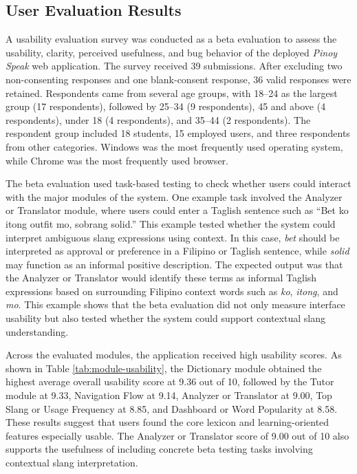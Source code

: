 \subsection{User Evaluation Results}
A usability evaluation survey was conducted as a beta evaluation to assess the usability, clarity, perceived usefulness, and bug behavior of the deployed \textit{Pinoy Speak} web application. The survey received 39 submissions. After excluding two non-consenting responses and one blank-consent response, 36 valid responses were retained. Respondents came from several age groups, with 18--24 as the largest group (17 respondents), followed by 25--34 (9 respondents), 45 and above (4 respondents), under 18 (4 respondents), and 35--44 (2 respondents). The respondent group included 18 students, 15 employed users, and three respondents from other categories. Windows was the most frequently used operating system, while Chrome was the most frequently used browser.

The beta evaluation used task-based testing to check whether users could interact with the major modules of the system. One example task involved the Analyzer or Translator module, where users could enter a Taglish sentence such as ``Bet ko itong outfit mo, sobrang solid.'' This example tested whether the system could interpret ambiguous slang expressions using context. In this case, \textit{bet} should be interpreted as approval or preference in a Filipino or Taglish sentence, while \textit{solid} may function as an informal positive description. The expected output was that the Analyzer or Translator would identify these terms as informal Taglish expressions based on surrounding Filipino context words such as \textit{ko}, \textit{itong}, and \textit{mo}. This example shows that the beta evaluation did not only measure interface usability but also tested whether the system could support contextual slang understanding.

Across the evaluated modules, the application received high usability scores. As shown in Table \ref{tab:module-usability}, the Dictionary module obtained the highest average overall usability score at 9.36 out of 10, followed by the Tutor module at 9.33, Navigation Flow at 9.14, Analyzer or Translator at 9.00, Top Slang or Usage Frequency at 8.85, and Dashboard or Word Popularity at 8.58. These results suggest that users found the core lexicon and learning-oriented features especially usable. The Analyzer or Translator score of 9.00 out of 10 also supports the usefulness of including concrete beta testing tasks involving contextual slang interpretation.

